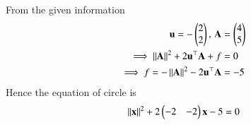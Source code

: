 From the given information
\begin{align}
	\mathbf{u} = -\begin{pmatrix}2\\2\end{pmatrix}, \, \mathbf{A} &= \begin{pmatrix}4\\5\end{pmatrix}\\
\implies	\left\lVert\mathbf{A}\right\rVert^2+2\mathbf{u}^\top\mathbf{A}+f &= 0\\
\implies	f = -\left\lVert\mathbf{A}\right\rVert^2 - 2\mathbf{u}^\top\mathbf{A}
	&= -5
\end{align}
Hence the equation of circle is 
\begin{align}
	\left\lVert\mathbf{x}\right\rVert^2+2\begin{pmatrix}-2&-2\end{pmatrix}\mathbf{x}-5 = 0 	
\end{align}

